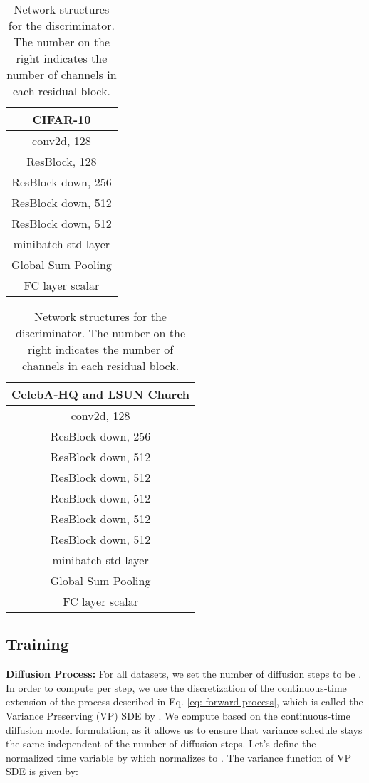 \begin{table}[ht]
  \caption{Network structures for the discriminator.  The number on the right indicates the number of channels in each residual block.}\label{table discriminator structure}
     \centering
     \begin{tabular}{c}
     \toprule
     CIFAR-10\\
     \midrule
      conv2d, 128\\
     ResBlock, 128\\
     ResBlock down, 256\\
     ResBlock down, 512\\
     ResBlock down, 512\\
     minibatch std layer\\
     Global Sum Pooling\\
     FC layer  scalar\\
     \midrule
     \end{tabular}
     \quad
     \begin{tabular}{c}
     \toprule
     CelebA-HQ and LSUN Church\\
     \midrule
      conv2d, 128\\
     ResBlock down, 256\\
     ResBlock down, 512\\
     ResBlock down, 512\\
     ResBlock down, 512\\
     ResBlock down, 512\\
     ResBlock down, 512\\
     minibatch std layer\\
     Global Sum Pooling\\
     FC layer  scalar\\
     \bottomrule
     \end{tabular}
 \end{table}
 
\subsection{Training}
\textbf{Diffusion Process: } For all datasets, we set the number of diffusion steps to be . In order to compute  per step, we use the discretization of the continuous-time extension of the process described in Eq. \ref{eq: forward process}, which is called the Variance Preserving (VP) SDE by \citet{song2020score}. We compute  based on the continuous-time diffusion model formulation, as it allows us to ensure that variance schedule stays the same independent of the number of diffusion steps. Let's define the normalized time variable by  which normalizes  to .
The variance function of VP SDE is given by: 

